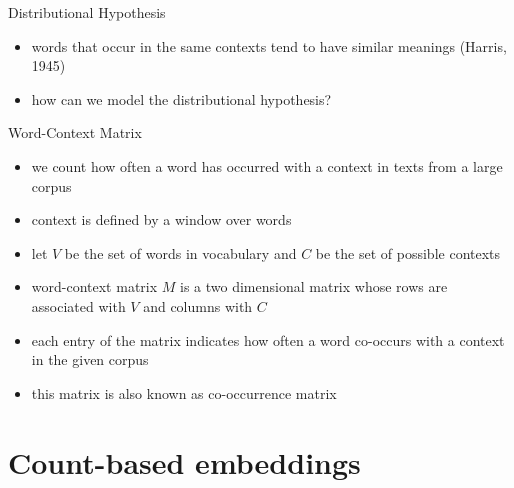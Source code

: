 \documentclass[12pt, handout]{beamer}
\begin{document}
\begin{frame}{Distributional Hypothesis}
	\begin{itemize}
		\item<1-> words that occur in the same contexts tend to have similar meanings (Harris, 1945)
		\item<2-> how can we model the distributional hypothesis?
	\end{itemize}
\end{frame}
\begin{frame}{Word-Context Matrix}
	\begin{itemize}
		\item<1-> we count how often a word has occurred with a context in texts from a large corpus
		\item<2-> context is defined by a window over words
		\item<3-> let $V$ be the set of words in vocabulary and $C$ be the set of possible contexts
		\item<4-> word-context matrix $M$ is a two dimensional matrix whose rows are associated with $V$ and columns with $C$
		\item<5-> each entry of the matrix indicates how often a word co-occurs with a context in the given corpus
		\item<6-> this matrix is also known as co-occurrence matrix
	\end{itemize}
\end{frame}

\section{Count-based embeddings}
\end{document}
